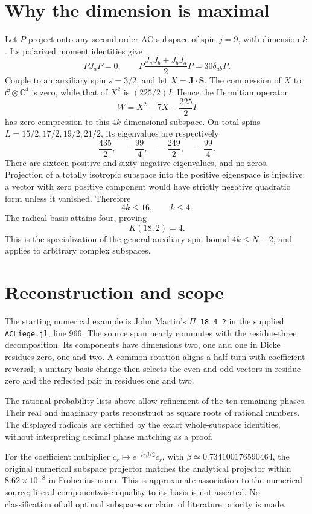 \documentclass[11pt]{article}
\begin{document}
\section{Why the dimension is maximal}
Let $P$ project onto any second-order AC subspace of spin $j=9$, with
dimension $k$. Its polarized moment identities give
\[
 PJ_aP=0,\qquad P\frac{J_aJ_b+J_bJ_a}{2}P=30\delta_{ab}P.
\]
Couple to an auxiliary spin $s=3/2$, and let $X=\mathbf J\cdot\mathbf S$.
The compression of $X$ to $\mathcal C\otimes\mathbb C^4$ is zero, while
that of $X^2$ is $(225/2)I$. Hence the Hermitian operator
\[
 W=X^2-7X-\frac{225}{2}I
\]
has zero compression to this $4k$-dimensional subspace.
On total spins $L=15/2,17/2,19/2,21/2$, its eigenvalues are respectively
\[
 \frac{435}{2},\quad-\frac{99}{4},\quad-\frac{249}{2},\quad-\frac{99}{4}.
\]
There are sixteen positive and sixty negative eigenvalues, and no zeros.
Projection of a totally isotropic subspace into the positive eigenspace
is injective: a vector with zero positive component would have strictly
negative quadratic form unless it vanished. Therefore
\[
 4k\le16,\qquad k\le4.
\]
The radical basis attains four, proving
\[
 \boxed{K(18,2)=4.}
\]
This is the specialization of the general auxiliary-spin bound
$4k\le N-2$, and applies to arbitrary complex subspaces.

\section{Reconstruction and scope}
The starting numerical example is John Martin's
\texttt{\(\Pi\)\_18\_4\_2} in the supplied \texttt{ACLiege.jl}, line 966.
The source span nearly commutes with the residue-three decomposition.
Its components have dimensions two, one and one in Dicke residues zero,
one and two. A common rotation aligns a half-turn with coefficient reversal;
a unitary basis change then selects the even and odd vectors in residue
zero and the reflected pair in residues one and two.

The rational probability lists above allow refinement of the ten remaining
phases. Their real and imaginary parts reconstruct as square roots of
rational numbers. The displayed radicals are certified by the exact
whole-subspace identities, without interpreting decimal phase matching
as a proof.

For the coefficient multiplier $c_r\mapsto e^{-ir\beta/2}c_r$, with
$\beta\simeq0.734100176590464$, the original numerical subspace projector
matches the analytical projector within $8.62\times10^{-8}$ in Frobenius
norm. This is approximate association to the numerical source; literal
componentwise equality to its basis is not asserted. No classification of
all optimal subspaces or claim of literature priority is made.
\end{document}

